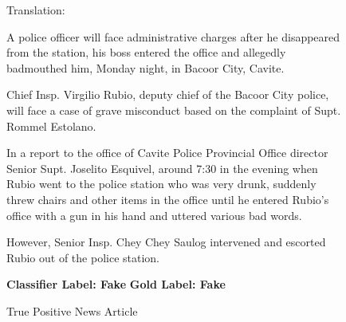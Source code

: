 \begin{figure}[h!]
{{                          Translation:\newline \newline
                          \small \raggedright A police officer will face administrative charges after he disappeared from the station, his boss entered the office and allegedly badmouthed him, Monday night, in Bacoor City, Cavite.\linebreak

                          \small \raggedright Chief Insp. Virgilio Rubio, deputy chief of the Bacoor City police, will face a case of grave misconduct based on the complaint of Supt. Rommel Estolano.\linebreak

                          \small \raggedright In a report to the office of Cavite Police Provincial Office director Senior Supt. Joselito Esquivel, around 7:30 in the evening when Rubio went to the police station who was very drunk, suddenly threw chairs and other items in the office until he entered Rubio's office with a gun in his hand and uttered various bad words.\linebreak

                          \small \raggedright However, Senior Insp. Chey Chey Saulog intervened and escorted Rubio out of the police station.\linebreak\linebreak

                          \textbf{Classifier Label: Fake} \newline
                          \textbf{Gold Label: Fake}

                            }
                        }

                         \caption{True Positive News Article}
                            \label{fig:true-positive-news-article}
                        \end{figure}

